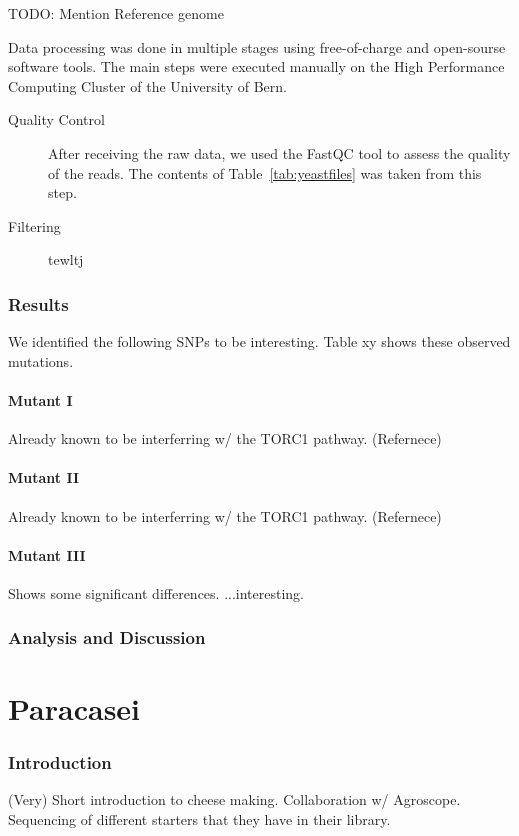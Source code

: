 \documentclass[10pt,a4paper]{article}
\begin{document}
TODO: Mention Reference genome

Data processing was done in multiple stages using free-of-charge and open-sourse software tools. The main steps were executed manually on the High Performance Computing Cluster of the University of Bern.

\begin{description}
\item[Quality Control] After receiving the raw data, we used the FastQC \cite{FastQC} tool to assess the quality of the reads. The contents of Table~\ref{tab:yeastfiles} was taken from this step. 
\item[Filtering] tewltj
\end{description}

\section{Results}

We identified the following SNPs to be interesting. Table xy shows these observed mutations.

\subsection{Mutant I}
Already known to be interferring w/ the TORC1 pathway. (Refernece)

\subsection{Mutant II}
Already known to be interferring w/ the TORC1 pathway. (Refernece)

\subsection{Mutant III}
Shows some significant differences. ...interesting.

\section{Analysis and Discussion}

\pagebreak
\part{Paracasei}
\setcounter{section}{0}

\section{Introduction}
(Very) Short introduction to cheese making. Collaboration w/ Agroscope. Sequencing of different starters that they have in their library.
\end{document}
